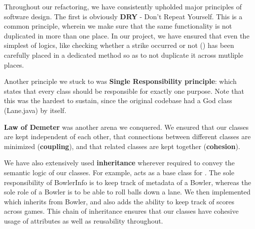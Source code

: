 Throughout our refactoring, we have consistently upholded major principles of software design. The first is obviously \textbf{DRY} - Don't Repeat Yourself. This is a common principle, wherein we make sure that the same functionality is not duplicated in more than one place. In our project, we have ensured that even the simplest of logics, like checking whether a strike occurred or not () has been carefully placed in a dedicated method so as to not duplicate it across mutliple places.

Another principle we stuck to was \textbf{Single Responsibility principle}: which states that every class should be responsible for exactly one purpose. Note that this was the hardest to sustain, since the original codebase had a God class (Lane.java) by itself.

\textbf{Law of Demeter} was another arena we conquered. We ensured that our classes are kept independent of each other, that connections between different classes are minimized (\textbf{coupling}), and that related classes are kept together (\textbf{cohesion}).

We have also extensively used \textbf{inheritance} wherever required to convey the semantic logic of our classes. For example,  acts as a base class for . The sole responsibility of BowlerInfo is to keep track of metadata of a Bowler, whereas the sole role of a Bowler is to be able to roll balls down a lane. We then implemented  which inherits from Bowler, and also adds the ability to keep track of scores across games. This chain of inheritance ensures that our classes have cohesive usage of attributes as well as reusability throughout.